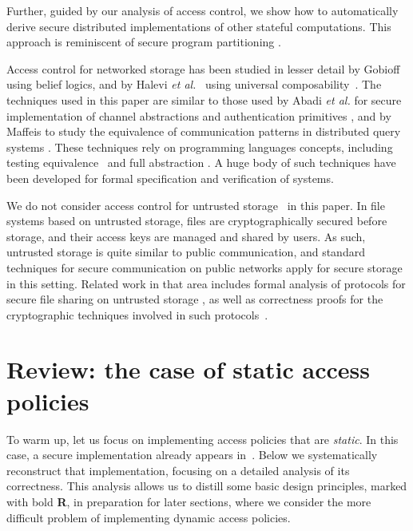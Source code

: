 \documentclass[10pt]{article}
\begin{document}
Further, guided by our analysis of access control, we show how to automatically derive secure distributed implementations of other stateful computations. This approach is reminiscent of secure program partitioning \cite{spp}. 



Access control for networked storage has been studied in lesser detail by Gobioff~\cite{gobioff-security} using belief logics, and by Halevi \emph{et al.}~\cite{Halevi05} using universal composability~\cite{ucframework}. The techniques used in this paper are similar to those used by Abadi \emph{et al.} for secure implementation of channel abstractions \cite{abadi98secure} and authentication primitives \cite{authprim}, and by Maffeis to study the equivalence of communication patterns in distributed query systems \cite{Maffeis05}. These techniques rely on  programming languages concepts, including testing equivalence~\cite{nicohenn84} and full abstraction \cite{milnerfullabs,pplt}. 
A huge body of such techniques have been developed for formal specification and verification of systems. 



We do not consider access control for untrusted storage~\cite{plutus} in this paper. In file systems based on untrusted storage, files are cryptographically secured before storage, and their access keys are managed and shared by users. As such, untrusted storage is quite similar to public communication, and standard techniques for secure communication on public networks apply for secure storage in this setting. 
Related work in that area includes formal analysis of protocols for secure file sharing on untrusted storage \cite{secfsbyz,Blanchet-Chaudhuri}, as well as correctness proofs for the cryptographic techniques  involved in such protocols~\cite{lazyrevcfs,keyregress,keyupd-lazyrev}. 



\section{Review: the case of static access policies}\label{intro-stat}
\noindent
To warm up, let us focus on implementing access policies that are \emph{static}. In this case, a secure implementation already appears in~\cite{ChaudhuriAbadi-FMSE05}. Below we systematically reconstruct that implementation, focusing on a detailed analysis of its correctness. This analysis allows us to distill some basic design principles, marked with bold {\bf R}, in preparation for later sections, where we consider the more difficult problem of implementing dynamic access policies.
\end{document}

